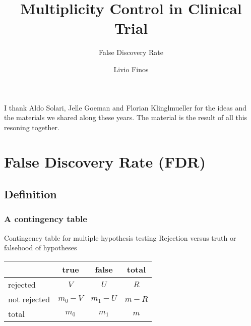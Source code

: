 \documentclass[xcolor={pdftex,dvipsnames,table}]{beamer}
\title[]{Multiplicity Control in Clinical Trial}
\subtitle{False Discovery Rate}
\author[\hspace{5cm}]{Livio Finos}
\date{}%
\newcommand{\bbf}[1]{\textcolor{black}{\bf #1}}
\newcommand{\rbf}[1]{\textcolor{redUnipd}{ #1}}
\newcommand{\bb}[1]{\begin{block}{#1}}
\newcommand{\eb}{\end{block}}
\newcommand{\bfr}[1]{\begin{frame} \frametitle{#1}}
\begin{document}
\begin{frame}
  \titlepage
\end{frame}

\begin{frame}
I thank Aldo Solari, Jelle Goeman and Florian Klinglmueller for the ideas and the materials we shared along these years. The material is the result of all this resoning together.

\end{frame}

\section{False Discovery Rate (FDR)}
\subsection{Definition}

% 

\bfr{A contingency table}
\begin{table}[!ht]
  \bb{Contingency table for multiple hypothesis testing}
    Rejection versus truth or falsehood of hypotheses
    \newline\ \\
    \begin{tabular}{lccc}
                  & true    & false   & total \\\hline
    rejected      & $V$     & $U$     & $R$ \\
    not rejected  & $m_0-V$ & $m_1-U$ & $m-R$ \\\hline
    total         & $m_0$   & $m_1$   & $m$
    \end{tabular}
  \eb
\end{table}
\end{frame}
\end{document}
